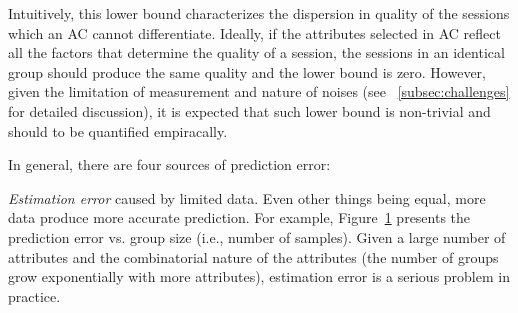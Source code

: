 Intuitively, this lower bound characterizes the dispersion in quality of the sessions which an AC cannot differentiate. Ideally, if the attributes selected in AC reflect all the factors that determine the quality of a session, the sessions in an identical group should produce the same quality and the lower bound is zero. However, given the limitation of measurement and nature of noises (see \Section~\ref{subsec:challenges} for detailed discussion), it is expected that such lower bound is non-trivial and should to be quantified empiracally.


\label{subsec:challenges}
In general, there are four sources of prediction error:

\begin{packedenumerate}
  \item \emph{Estimation error} caused by limited data.  Even other things being equal, more data produce more accurate prediction. For example, Figure~\ref{fig:group-size-impact} presents the prediction error vs. group size (i.e., number of samples). Given a large number of attributes and the combinatorial nature of the attributes (the number of groups grow exponentially with more attributes), estimation error is a serious problem in practice. 


\begin{figure}[h!]
\centering
{}
\label{fig:group-size-impact}
\end{figure}


\end{packedenumerate}

